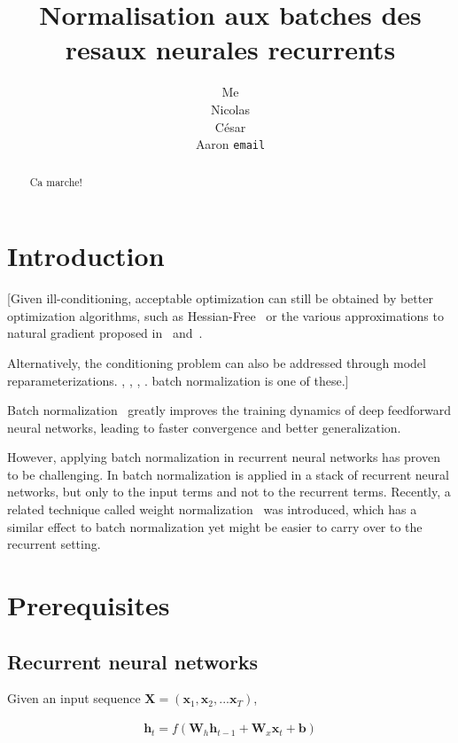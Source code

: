 \documentclass{article} %
\title{Normalisation aux batches des resaux neurales recurrents}
\author{
Me \\
\And
Nicolas \\
\And
C\'esar \\
\And
Aaron
\texttt{email} \\
}
\newcommand{\vect}[1]{\mathbf{#1}}
\newcommand{\mat}[1]{\mathbf{#1}}
\begin{document}
\maketitle

\begin{abstract}
\,Ca marche!
\end{abstract}

\section{Introduction}

[Given ill-conditioning, acceptable optimization can still be obtained by better optimization algorithms, such as
Hessian-Free~\cite{hessianfree} or the various approximations to natural gradient proposed in~\cite{ollivier} and~\cite{KFAC}.

Alternatively, the conditioning problem can also be addressed through model reparameterizations.
\cite{lecun}, \cite{raiko}, \cite{pascanu}, \cite{desjardins}.
batch normalization is one of these.]

Batch normalization~\cite{ioffe2015batch} greatly improves the training dynamics of deep feedforward neural networks, leading to faster convergence and better generalization.

However, applying batch normalization in recurrent neural networks has proven to be challenging.
In \cite{Baidu} batch normalization is applied in a stack of recurrent neural networks, but only to the input terms and not to the recurrent terms.
\cite{Cesar} 
Recently, a related technique called weight normalization~\cite{salimans2016weight} was introduced, which has a similar effect to batch normalization yet might be easier to carry over to the recurrent setting.

\section{Prerequisites}
\subsection{Recurrent neural networks}

Given an input sequence $\mat{X} = ( \vect{x}_1, \vect{x}_2, ... \vect{x}_T )$,

\begin{align}
\vect{h}_t = f(
  \mat{W}_h \vect{h}_{t-1} +
  \mat{W}_x \vect{x}_t +
  \vect{b})
\end{align}
\end{document}
